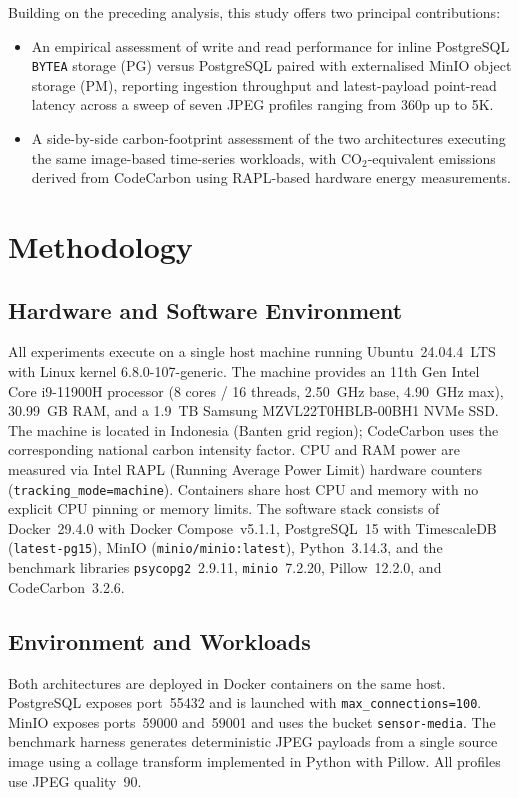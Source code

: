 \documentclass[conference]{IEEEtran}
\begin{document}
Building on the preceding analysis, this study offers two principal contributions:
\begin{itemize}
    \item An empirical assessment of write and read performance for inline PostgreSQL \texttt{BYTEA} storage (PG) versus PostgreSQL paired with externalised MinIO object storage (PM), reporting ingestion throughput and latest-payload point-read latency across a sweep of seven JPEG profiles ranging from 360p up to 5K.
    \item A side-by-side carbon-footprint assessment of the two architectures executing the same image-based time-series workloads, with CO$_2$-equivalent emissions derived from CodeCarbon using RAPL-based hardware energy measurements.
\end{itemize}

\section{Methodology}
\label{sec:methodology}

\subsection{Hardware and Software Environment}
All experiments execute on a single host machine running Ubuntu~24.04.4~LTS with Linux kernel 6.8.0-107-generic. The machine provides an 11th Gen Intel Core i9-11900H processor (8 cores / 16 threads, 2.50~GHz base, 4.90~GHz max), 30.99~GB RAM, and a 1.9~TB Samsung MZVL22T0HBLB-00BH1 NVMe SSD. The machine is located in Indonesia (Banten grid region); CodeCarbon uses the corresponding national carbon intensity factor. CPU and RAM power are measured via Intel RAPL (Running Average Power Limit) hardware counters (\texttt{tracking\_mode=machine}). Containers share host CPU and memory with no explicit CPU pinning or memory limits. The software stack consists of Docker~29.4.0 with Docker Compose~v5.1.1, PostgreSQL~15 with TimescaleDB (\texttt{latest-pg15}), MinIO (\texttt{minio/minio:latest}), Python~3.14.3, and the benchmark libraries \texttt{psycopg2}~2.9.11, \texttt{minio}~7.2.20, Pillow~12.2.0, and CodeCarbon~3.2.6.

\subsection{Environment and Workloads}
Both architectures are deployed in Docker containers on the same host. PostgreSQL exposes port~55432 and is launched with \texttt{max\_connections=100}. MinIO exposes ports~59000 and~59001 and uses the bucket \texttt{sensor-media}. The benchmark harness generates deterministic JPEG payloads from a single source image using a collage transform implemented in Python with Pillow. All profiles use JPEG quality~90.
\end{document}
